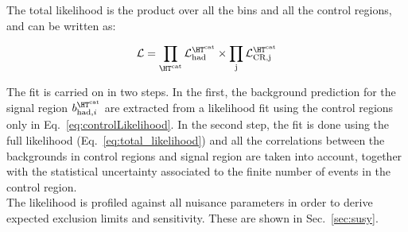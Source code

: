 The total likelihood is the product over all the \htcat bins and all the control regions, and can be written as:

\begin{equation}
\label{eq:total_likelihood}
\mathcal{L} = \prod_{\htcat} \mathcal{L}_{\text{had}}^{\htcat} \times \prod_{\text{j}} \mathcal{L}_{\text{CR,j}}^{\htcat}
\end{equation}

The fit is carried on in two steps. 
In the first, the background prediction for the signal region $b^{\htcat}_{\mathrm{had},i}$ are extracted from a likelihood fit 
using the control regions only in Eq.~\ref{eq:controlLikelihood}. 
In the second step, the fit is done using the full likelihood (Eq.~\ref{eq:total_likelihood}) and all 
the correlations between the backgrounds in control regions and signal region are taken into account, 
together with the statistical uncertainty associated to the finite number of events in the control region. \\
The likelihood is profiled against all nuisance parameters in order to derive expected exclusion limits and sensitivity. 
These are shown in Sec.~\ref{sec:susy}. 





